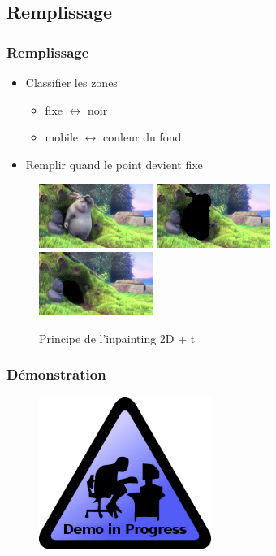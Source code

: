 \subsection{Remplissage}
\begin{frame}
  \frametitle{Remplissage}
  
  \begin{itemize}
  \item Classifier les zones
  	\begin{itemize}
  	\item fixe $\leftrightarrow$ noir
  	\item mobile $\leftrightarrow$ couleur du fond
  	\end{itemize}
  \item Remplir quand le point devient fixe  
  \end{itemize}

  \begin{figure}
  \includegraphics[width=0.33\textwidth]{Fig/bunny1-original.png}
  \includegraphics[width=0.33\textwidth]{Fig/bunny2-masked.png}
  \includegraphics[width=0.33\textwidth]{Fig/bunny3-inpainted.png}
  \caption{Principe de l'inpainting 2D + t}
  \end{figure}
   
\end{frame}


 \begin{frame}
   \frametitle{Démonstration}
   \begin{figure}
   \includegraphics[width=0.5\textwidth]{Fig/demoInProgress.png}
   \end{figure}

 \end{frame}